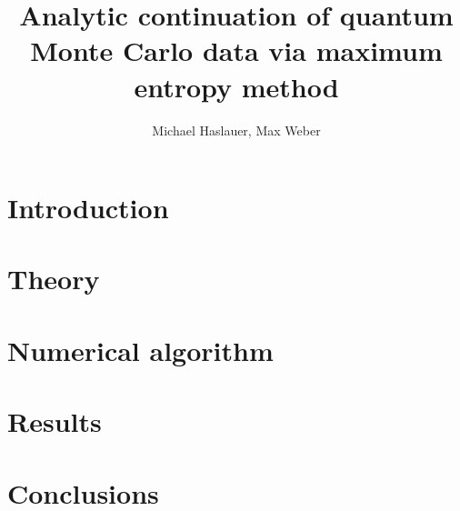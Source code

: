 \documentclass[10pt,letterpaper]{article}
\begin{document}
\title{Analytic continuation of quantum Monte Carlo data via maximum entropy method}
\author{Michael Haslauer, Max Weber}


\section{Introduction} %
\label{sec:introduction}

\section{Theory} %
\label{sec:theory}

\section{Numerical algorithm} %
\label{sec:numerical_algorithm}

\section{Results} %
\label{sec:results}

\section{Conclusions} %
\label{sec:conclusions}
\end{document}
